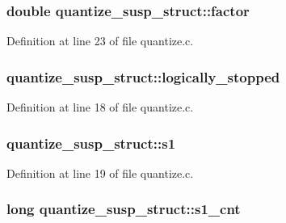 \subsubsection[{\texorpdfstring{factor}{factor}}]{\setlength{\rightskip}{0pt plus 5cm}double quantize\+\_\+susp\+\_\+struct\+::factor}\hypertarget{structquantize__susp__struct_aaae096a9eb40eb16f9c150b8589068c3}{}\label{structquantize__susp__struct_aaae096a9eb40eb16f9c150b8589068c3}


Definition at line 23 of file quantize.\+c.

\subsubsection[{\texorpdfstring{logically\+\_\+stopped}{logically_stopped}}]{ quantize\+\_\+susp\+\_\+struct\+::logically\+\_\+stopped}\hypertarget{structquantize__susp__struct_ae5b076ce0aaa9bc412c62d79fbc94ee5}{}\label{structquantize__susp__struct_ae5b076ce0aaa9bc412c62d79fbc94ee5}


Definition at line 18 of file quantize.\+c.

\subsubsection[{\texorpdfstring{s1}{s1}}]{ quantize\+\_\+susp\+\_\+struct\+::s1}\hypertarget{structquantize__susp__struct_a025bb9d218d19859557eb76837418741}{}\label{structquantize__susp__struct_a025bb9d218d19859557eb76837418741}


Definition at line 19 of file quantize.\+c.

\subsubsection[{\texorpdfstring{s1\+\_\+cnt}{s1_cnt}}]{\setlength{\rightskip}{0pt plus 5cm}long quantize\+\_\+susp\+\_\+struct\+::s1\+\_\+cnt}\hypertarget{structquantize__susp__struct_aa066a2a7392c6ff0b6f6cd081a4745a4}{}\label{structquantize__susp__struct_aa066a2a7392c6ff0b6f6cd081a4745a4}


